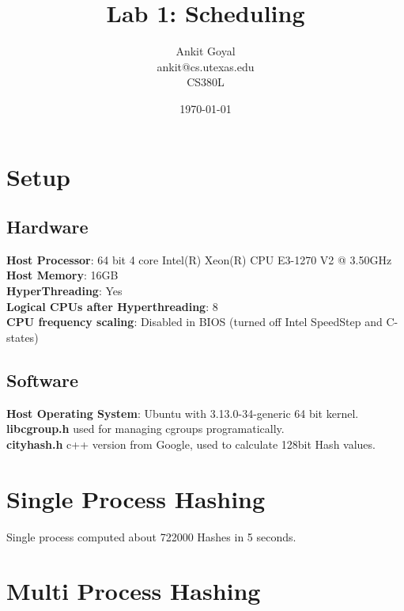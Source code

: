 \documentclass[10pt] {article}
\author{Ankit Goyal \\ankit@cs.utexas.edu \\ CS380L}
\title{Lab 1: Scheduling}
\date{\today}
\begin{document}
\maketitle

\section{Setup}
\subsection{Hardware}
\textbf{Host Processor}: 64 bit 4 core Intel(R) Xeon(R) CPU E3-1270 V2 @ 3.50GHz\\
\textbf{Host Memory}: 16GB \\
\textbf{HyperThreading}: Yes \\
\textbf{Logical CPUs after Hyperthreading}: 8 \\
\textbf{CPU frequency scaling}: Disabled in BIOS (turned off Intel SpeedStep and C-states)

\subsection{Software}
\textbf{Host Operating System}: Ubuntu with 3.13.0-34-generic 64 bit kernel.\\
\textbf{libcgroup.h} used for managing cgroups programatically.\\
\textbf{cityhash.h} c++ version from Google, used to calculate 128bit Hash values.


\section{Single Process Hashing}

Single process computed about 722000 Hashes in 5 seconds.


\section{Multi Process Hashing}
\end{document}
